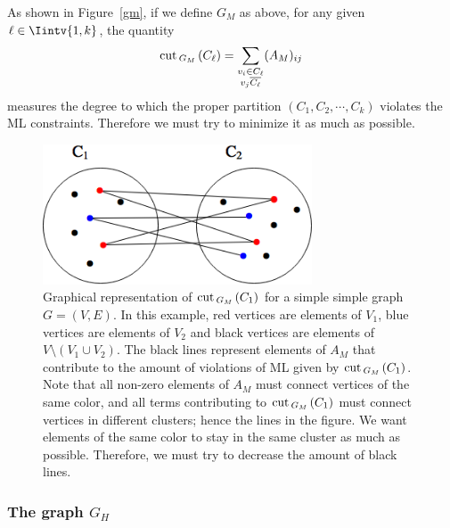 As shown in Figure~\vref{gm}, if we define $G_M$ as above, for any given $\ell \in \Iintv{1,k}$, the quantity
\begin{equation}
   \operatorname{cut\,}_{G_M\,}(C_{\ell}) = \sum_{\substack{v_i \in C_{\ell} \\ v_j \overline{C_{\ell}}}} (A_M)_{ij} 
\end{equation}
measures the degree to which the proper partition $(C_1, C_2, \cdots, C_k)$ violates the ML constraints.
Therefore we must try to minimize it as much as possible.

\begin{figure}
\begin{center}
\includegraphics[width=8cm]{figures/gm.png}
\end{center}
   \caption[Graphical representation of $\cut_{G_M\,}(C_1)$ for a simple graph $G=(V,E)$]{Graphical representation of $\cut _{G_M\,}(C_1)$ for a simple simple graph $G = (V,E)$.  In this example, red vertices are elements of $V_1$, blue vertices are elements of $V_2$ and black vertices are elements of $V \setminus (V_1 \cup V_2)$. The black lines represent elements of $A_M$ that contribute to the amount of violations of ML given by $\cut _{G_M\,}(C_1)$. Note that all non-zero elements of $A_M$ must connect vertices of the same color, and all terms contributing to $\cut _{G_M\,}(C_1)$ must connect vertices in different clusters; hence the lines in the figure. We want elements of the same color to stay in the same cluster as much as possible. Therefore, we must try to decrease the amount of black lines.}
\label{gm}
\end{figure}

\subsubsection*{The graph $G_H$}

